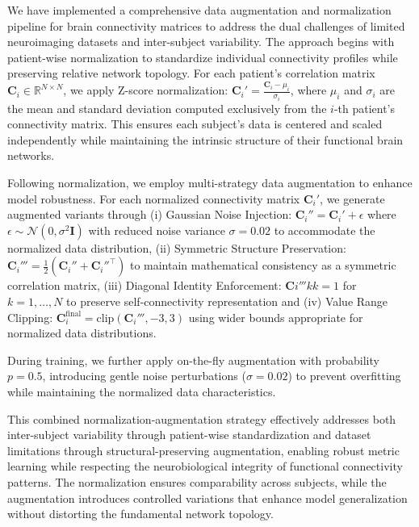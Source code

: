 \documentclass[a4paper,12pt,reqno]{amsart}
\theoremstyle{definition}
\theoremstyle{remark}
\begin{document}
We have implemented a comprehensive data augmentation and normalization pipeline for brain connectivity matrices to address the dual challenges of limited neuroimaging datasets and inter-subject variability. The approach begins with patient-wise normalization to standardize individual connectivity profiles while preserving relative network topology. For each patient's correlation matrix $\mathbf{C}_i \in \mathbb{R}^{N \times N}$, we apply Z-score normalization: $\mathbf{C}_i' = \frac{\mathbf{C}_i - \mu_i}{\sigma_i}$, where $\mu_i$ and $\sigma_i$ are the mean and standard deviation computed exclusively from the $i$-th patient's connectivity matrix. This ensures each subject's data is centered and scaled independently while maintaining the intrinsic structure of their functional brain networks.

Following normalization, we employ multi-strategy data augmentation to enhance model robustness. For each normalized connectivity matrix $\mathbf{C}_i'$, we generate augmented variants through (i) Gaussian Noise Injection: $\mathbf{C}_i'' = \mathbf{C}_i' + \epsilon$ where $\epsilon \sim \mathcal{N}(0, \sigma^2\mathbf{I})$ with reduced noise variance $\sigma=0.02$ to accommodate the normalized data distribution, (ii) Symmetric Structure Preservation: $\mathbf{C}_i''' = \frac{1}{2}(\mathbf{C}_i'' + {\mathbf{C}_i''}^\top)$ to maintain mathematical consistency as a symmetric correlation matrix, (iii) Diagonal Identity Enforcement: $\mathbf{C}i'''{kk} = 1$ for $k=1,\ldots,N$ to preserve self-connectivity representation and (iv) Value Range Clipping: $\mathbf{C}_i^{\text{final}} = \text{clip}(\mathbf{C}_i''', -3, 3)$ using wider bounds appropriate for normalized data distributions.

During training, we further apply on-the-fly augmentation with probability $p=0.5$, introducing gentle noise perturbations ($\sigma=0.02$) to prevent overfitting while maintaining the normalized data characteristics.

This combined normalization-augmentation strategy effectively addresses both inter-subject variability through patient-wise standardization and dataset limitations through structural-preserving augmentation, enabling robust metric learning while respecting the neurobiological integrity of functional connectivity patterns. The normalization ensures comparability across subjects, while the augmentation introduces controlled variations that enhance model generalization without distorting the fundamental network topology.
\end{document}
